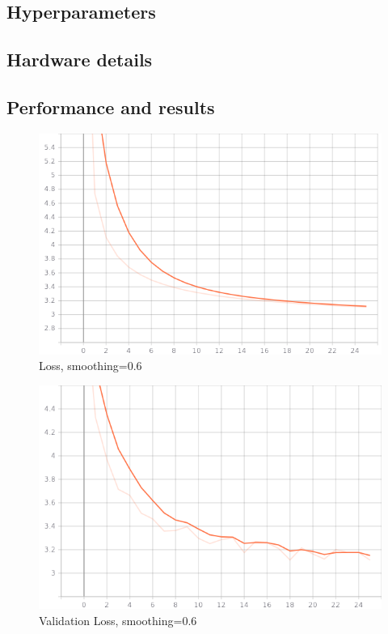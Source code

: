 \documentclass[twoside,twocolumn]{article}
\begin{document}
\subsection{Hyperparameters}

\subsection{Hardware details}

\subsection{Performance and results}

\begin{figure}
	\includegraphics[width=\linewidth]{img/loss.png}
	\caption{Loss, smoothing=0.6}
	\label{fig:loss}
\end{figure}

\begin{figure}
	\includegraphics[width=\linewidth]{img/val_loss.png}
	\caption{Validation Loss, smoothing=0.6}
	\label{fig:valloss}
\end{figure}
\end{document}
